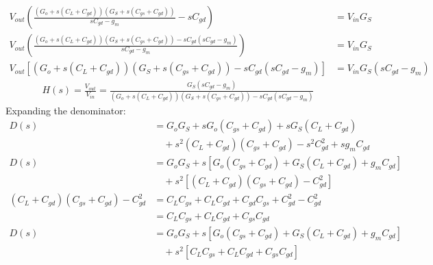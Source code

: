 \begin{enumerate}
    \begin{align*}
      V_{out}\left(\frac{(G_o + s(C_L + C_{gd}))(G_S + s(C_{gs} + C_{gd}))}{sC_{gd} - g_m} - sC_{gd}\right) &= V_{in} G_S \\
      V_{out}\left(\frac{(G_o + s(C_L + C_{gd}))(G_S + s(C_{gs} + C_{gd})) - sC_{gd}(sC_{gd} - g_m)}{sC_{gd} - g_m}\right) &= V_{in} G_S \\
      V_{out}\left[(G_o + s(C_L + C_{gd}))(G_S + s(C_{gs} + C_{gd})) - sC_{gd}(sC_{gd} - g_m)\right] &= V_{in} G_S (sC_{gd} - g_m)
    \end{align*}
    \begin{align*}
      H(s) = \frac{V_{out}}{V_{in}} = \frac{G_S (sC_{gd} - g_m)}{(G_o + s(C_L + C_{gd}))(G_S + s(C_{gs} + C_{gd})) - sC_{gd}(sC_{gd} - g_m)} \tag{4}
    \end{align*}
    Expanding the denominator:
    \begin{align*}
      D(s) &= G_o G_S + s G_o (C_{gs} + C_{gd}) + s G_S (C_L + C_{gd}) \\
           &\quad + s^2 (C_L + C_{gd})(C_{gs} + C_{gd}) - s^2 C_{gd}^2 + s g_m C_{gd} \\
      D(s) &= G_o G_S + s\left[G_o (C_{gs} + C_{gd}) + G_S (C_L + C_{gd}) + g_m C_{gd}\right] \\
           &\quad + s^2 \left[(C_L + C_{gd})(C_{gs} + C_{gd}) - C_{gd}^2\right] \\
      (C_L + C_{gd})(C_{gs} + C_{gd}) - C_{gd}^2 &= C_L C_{gs} + C_L C_{gd} + C_{gd} C_{gs} + C_{gd}^2 - C_{gd}^2 \\
           &= C_L C_{gs} + C_L C_{gd} + C_{gs} C_{gd} \\
      D(s) &= G_o G_S + s\left[G_o (C_{gs} + C_{gd}) + G_S (C_L + C_{gd}) + g_m C_{gd}\right] \\
           &\quad + s^2 \left[C_L C_{gs} + C_L C_{gd} + C_{gs} C_{gd}\right]
    \end{align*}
\end{enumerate}

